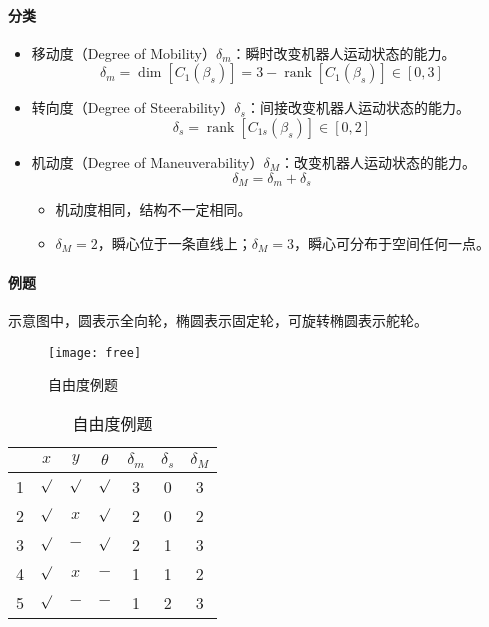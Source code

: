 \documentclass[
12pt, %
a4paper, 
oneside, %
headinclude,footinclude, %
]{scrartcl}
\begin{document}
\paragraph{分类}
\begin{itemize}
\item 移动度（Degree of Mobility）$ \delta_m $：瞬时改变机器人运动状态的能力。
$$ \delta_m = \dim[C_1(\beta_s)] = 3 - \operatorname{rank}[C_1(\beta_s)] \in [0,3] $$
\item 转向度（Degree of Steerability）$ \delta_s $：间接改变机器人运动状态的能力。
$$ \delta_s = \operatorname{rank}[C_{1s}(\beta_s)] \in [0,2] $$
\item 机动度（Degree of Maneuverability）$ \delta_M $：改变机器人运动状态的能力。
$$ \delta_M = \delta_m + \delta_s $$
\begin{itemize}
\item 机动度相同，结构不一定相同。
\item $ \delta_M = 2 $，瞬心位于一条直线上；$ \delta_M = 3 $，瞬心可分布于空间任何一点。
\end{itemize}
\end{itemize}
\paragraph{例题}
示意图中，圆表示全向轮，椭圆表示固定轮，可旋转椭圆表示舵轮。

\noindent
\begin{minipage}{0.6\textwidth}
\begin{figure}[H]
\centering 
\texttt{[image: free]} 
\caption{自由度例题}
\end{figure}
\end{minipage}
\begin{minipage}{0.4\textwidth}
\begin{table}[H]
\centering
\begin{tabular}{c|cccccc}
\hline
 & $ x $ & $ y $ & $ \theta $ & $ \delta_m $ & $ \delta_s $ & $ \delta_M $ \\
\hline
1 & $ \surd $ & $ \surd $ & $ \surd $ & 3 & 0 & 3 \\
2 & $ \surd $ & $ x $ & $ \surd $ & 2 & 0 & 2 \\
3 & $ \surd $ & $ - $ & $ \surd $ & 2 & 1 & 3 \\
4 & $ \surd $ & $ x $ & $ - $ & 1 & 1 & 2 \\
5 & $ \surd $ & $ - $ & $ - $ & 1 & 2 & 3 \\
\hline
\end{tabular}
\caption{自由度例题}
\end{table}
\end{minipage}
\end{document}
